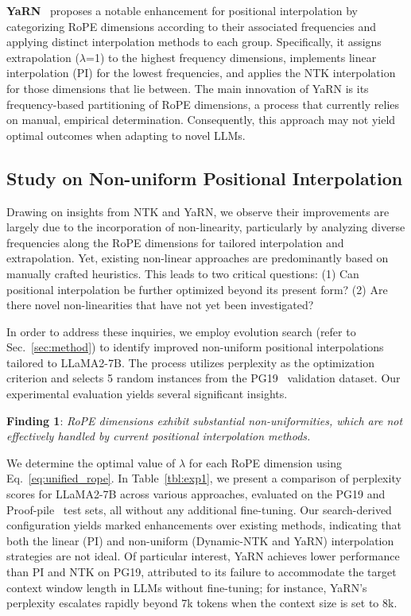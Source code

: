 \textbf{YaRN}~\cite{yarn} proposes a notable enhancement for positional interpolation by categorizing RoPE dimensions according to their associated frequencies and applying distinct interpolation methods to each group. Specifically, it assigns extrapolation ($\lambda$=1) to the highest frequency dimensions, implements linear interpolation (PI) for the lowest frequencies, and applies the NTK interpolation for those dimensions that lie between. The main innovation of YaRN is its frequency-based partitioning of RoPE dimensions, a process that currently relies on manual, empirical determination. Consequently, this approach may not yield optimal outcomes when adapting to novel LLMs.

\subsection{Study on Non-uniform Positional Interpolation}

Drawing on insights from NTK and YaRN, we observe their improvements are largely due to the incorporation of non-linearity, particularly by analyzing diverse frequencies along the RoPE dimensions for tailored interpolation and extrapolation. Yet, existing non-linear approaches are predominantly based on manually crafted heuristics. This leads to two critical questions: (1) Can positional interpolation be further optimized beyond its present form? (2) Are there novel non-linearities that have not yet been investigated?

In order to address these inquiries, we employ evolution search (refer to Sec.~\ref{sec:method}) to identify improved non-uniform positional interpolations tailored to LLaMA2-7B. The process utilizes perplexity as the optimization criterion and selects 5 random instances from the PG19~\cite{pg19} validation dataset. Our experimental evaluation yields several significant insights.

\textbf{Finding 1}: \textit{RoPE dimensions exhibit substantial non-uniformities, which are not effectively handled by current positional interpolation methods.}

We determine the optimal value of $\lambda$ for each RoPE dimension using Eq.~\ref{eq:unified_rope}. In Table~\ref{tbl:exp1}, we present a comparison of perplexity scores for LLaMA2-7B across various approaches, evaluated on the PG19 and Proof-pile~\cite{proof-pile} test sets, all without any additional fine-tuning. Our search-derived configuration yields marked enhancements over existing methods, indicating that both the linear (PI) and non-uniform (Dynamic-NTK and YaRN) interpolation strategies are not ideal. Of particular interest, YaRN achieves lower performance than PI and NTK on PG19, attributed to its failure to accommodate the target context window length in LLMs without fine-tuning; for instance, YaRN’s perplexity escalates rapidly beyond 7k tokens when the context size is set to 8k.

